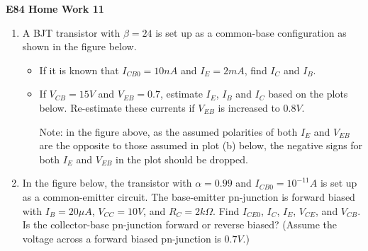 \usepackage{html}

\begin{center}
{\Large \bf  E84 Home Work 11}
\end{center}

\begin{enumerate}

\item A BJT transistor with $\beta=24$ is set up as a common-base 
configuration as shown in the figure below. 

\begin{itemize} 
\item If it is known that $I_{CB0}=10 nA$ and $I_E=2 mA$, find $I_C$ 
  and $I_B$.
\item If $V_{CB}=15V$ and $V_{EB}=0.7$, estimate $I_E$, $I_B$ and $I_C$ 
  based on the plots below. Re-estimate these currents if $V_{EB}$ is 
  increased to $0.8V$.

  Note: in the figure above, as the assumed polarities of both $I_E$ and 
  $V_{EB}$ are the opposite to those assumed in plot (b) below, the negative
  signs for both $I_E$ and $V_{EB}$ in the plot should be dropped.

\end{itemize}


% 

\item In the figure below, the transistor with $\alpha=0.99$ and
  $I_{CB0}=10^{-11} A$ is set up as a common-emitter circuit. The
  base-emitter pn-junction is forward biased with $I_B=20 \mu A$, 
  $V_{CC}=10V$, and $R_C=2k\Omega$. Find $I_{CE0}$, $I_C$, $I_E$, 
  $V_{CE}$, and $V_{CB}$. Is the collector-base pn-junction forward
  or reverse biased? (Assume the voltage across a forward biased 
  pn-junction is $0.7 V$.)
  



\end{enumerate}
